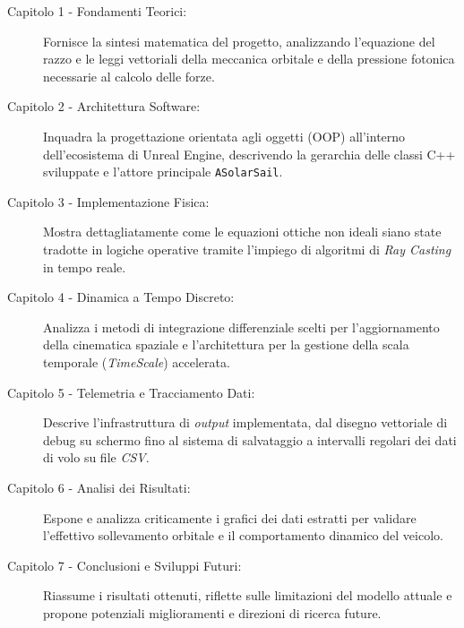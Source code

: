 \begin{description}
    \item[Capitolo 1 - Fondamenti Teorici:] Fornisce la sintesi matematica del progetto, analizzando l'equazione del razzo e le leggi vettoriali della meccanica orbitale e della pressione fotonica necessarie al calcolo delle forze.
    \item[Capitolo 2 - Architettura Software:] Inquadra la progettazione orientata agli oggetti (OOP) all'interno dell'ecosistema di Unreal Engine, descrivendo la gerarchia delle classi C++ sviluppate e l'attore principale \lstinline|ASolarSail|.
    \item[Capitolo 3 - Implementazione Fisica:] Mostra dettagliatamente come le equazioni ottiche non ideali siano state tradotte in logiche operative tramite l'impiego di algoritmi di \textit{Ray Casting} in tempo reale.
    \item[Capitolo 4 - Dinamica a Tempo Discreto:] Analizza i metodi di integrazione differenziale scelti per l'aggiornamento della cinematica spaziale e l'architettura per la gestione della scala temporale (\textit{TimeScale}) accelerata.
    \item[Capitolo 5 - Telemetria e Tracciamento Dati:] Descrive l'infrastruttura di \textit{output} implementata, dal disegno vettoriale di debug su schermo fino al sistema di salvataggio a intervalli regolari dei dati di volo su file \textit{CSV}.
    \item[Capitolo 6 - Analisi dei Risultati:] Espone e analizza criticamente i grafici dei dati estratti per validare l'effettivo sollevamento orbitale e il comportamento dinamico del veicolo.
    \item[Capitolo 7 - Conclusioni e Sviluppi Futuri:] Riassume i risultati ottenuti, riflette sulle limitazioni del modello attuale e propone potenziali miglioramenti e direzioni di ricerca future.
\end{description}

